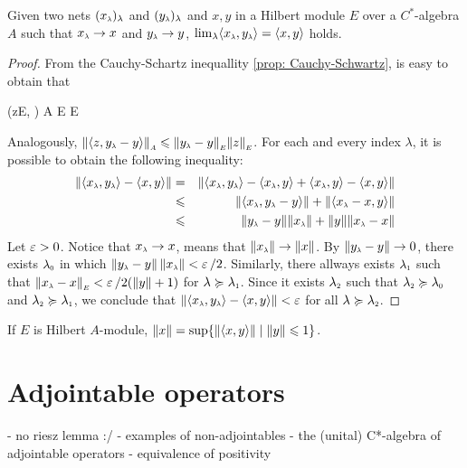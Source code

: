 \begin{lema}
\label{lema: lim <x_lambda,y_lambda> = <x,y>}
Given two nets $(\sub x\lambda)_\lambda$ and $(\sub y\lambda)_\lambda$ and $x,y$ in a Hilbert module $E$ over a $C^*$-algebra $A$ such that $\sub x\lambda \to x$ and $\sub y\lambda \to y$,  $\lim_\lambda \inner{\sub x\lambda}{\sub y\lambda} = \inner xy$ holds.
\begin{proof}
From the Cauchy-Schartz inequallity \ref{prop: Cauchy-Schwartz}, is easy to obtain that
\begin{eqspaced*}{(z\in E, \lambda \in \LLambda)}
    A \overset{(\ref{eq: cauchy-schwarts})}\leqslant {}E E
\end{eqspaced*}
Analogously, $\sub{\|\inner z{\sub y\lambda-y}\|}A \leqslant \sub{\|\sub y\lambda-y\|}E \sub{\|z\|}E$. For each and every index $\lambda$, it is possible to obtain the following inequality:
\begin{eqnarray*}
    \|\inner{\sub x\lambda}{\sub y\lambda} - \inner xy\| &=& \|\inner{\sub x\lambda}{\sub y\lambda} - \inner{\sub x\lambda}y + \inner{\sub x\lambda}y- \inner xy\|  \\
    &\leqslant& \|\inner{\sub x\lambda}{\sub y\lambda-y}\| + \| \inner{\sub x\lambda-x}y\| \\
    &\leqslant& \|\sub y\lambda-y\| \|\sub x\lambda\| +\|y\|\|\sub x\lambda-x\| 
\end{eqnarray*}
Let $\operatorname{{\varepsilon}} > 0$. Notice that $\sub x\lambda \to x$, means that $\|\sub x\lambda\| \to \|x\|$. By $\|\sub y\lambda -y\|\to 0$,  there exists $\sub\lambda 0$ in which $\|\sub y\lambda - y\|\,\|\sub x\lambda\|  < \ep/2 $. Similarly, there allways exists $\sub\lambda1$ such that $\sub{\|\sub x\lambda -x\|}E < \ep/2({\|y\|}+1)$ for $\lambda \succeq \sub\lambda1$. Since it exists $\sub\lambda2 $ such that $\sub\lambda2 \succeq \sub\lambda0$ and $\sub\lambda2 \succeq \sub\lambda1$, we conclude that $\|\inner{\sub x\lambda}{\sub y\lambda} - \inner xy\| < \ep$ for all $\lambda \succeq \sub\lambda2$.
\end{proof}
\end{lema}


\begin{proposicao}
If $E$ is Hilbert $A$-module, $\|x\| = \sup\{\|\langle {x},{y}\rangle\| \mid \|y\| \leqslant 1\}$.
\end{proposicao}

\section{Adjointable operators}
- no riesz lemma :/
- examples of non-adjointables
- the (unital) C*-algebra of adjointable operators
- equivalence of positivity